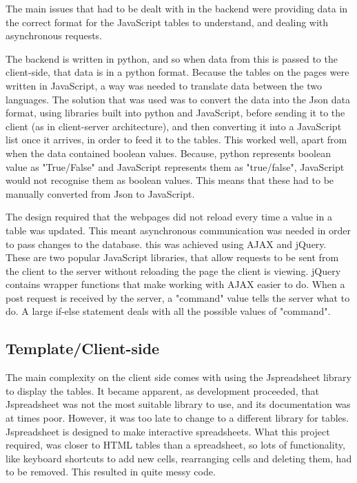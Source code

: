 \documentclass{l4proj}
\begin{document}
The main issues that had to be dealt with in the backend were providing data in the correct format for the JavaScript tables to understand, and dealing with asynchronous requests.

The backend is written in python, and so when data from this is passed to the client-side, that data is in a python format. Because the tables on the pages were written in JavaScript, a way was needed to translate data between the two languages. The solution that was used was to convert the data into the Json data format, using libraries built into python and JavaScript, before sending it to the client (as in client-server architecture), and then converting it into a JavaScript list once it arrives, in order to feed it to the tables. This worked well, apart from when the data contained boolean values. Because, python represents boolean value as "True/False" and JavaScript represents them as "true/false", JavaScript would not recognise them as boolean values. This means that these had to be manually converted from Json to JavaScript.

The design required that the webpages did not reload every time a value in a table was updated. This meant asynchronous communication was needed in order to pass changes to the database. this was achieved using AJAX and jQuery. These are two popular JavaScript libraries, that allow requests to be sent from the client to the server without reloading the page the client is viewing. jQuery contains wrapper functions that make working with AJAX easier to do. When a post request is received by the server, a "command" value tells the server what to do. A large if-else statement deals with all the possible values of "command".

\subsection{Template/Client-side}

The main complexity on the client side comes with using the Jspreadsheet library to display the tables. It became apparent, as development proceeded, that Jspreadsheet was not the most suitable library to use, and its documentation was at times poor. However, it was too late to change to a different library for tables. Jspreadsheet is designed to make interactive spreadsheets. What this project required, was closer to HTML tables than a spreadsheet, so lots of functionality, like keyboard shortcuts to add new cells, rearranging cells and deleting them, had to be removed. This resulted in quite messy code.
\end{document}
